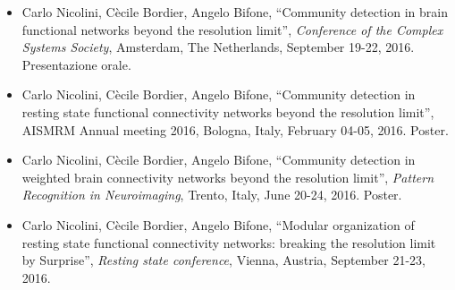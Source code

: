 \begin{itemize}
	\item Carlo Nicolini, Cècile Bordier, Angelo Bifone, ``Community detection in  brain functional networks beyond the resolution limit'', \emph{Conference of the Complex Systems Society},  Amsterdam, The Netherlands, September 19-22, 2016. Presentazione orale.
	\item Carlo Nicolini, Cècile Bordier, Angelo Bifone, ``Community detection in resting state functional connectivity networks beyond the resolution limit'', AISMRM Annual meeting 2016, Bologna, Italy, February 04-05, 2016. Poster.
	\item Carlo Nicolini, Cècile Bordier, Angelo Bifone, ``Community detection in weighted brain connectivity networks beyond the resolution limit'', \emph{Pattern Recognition in Neuroimaging}, Trento, Italy, June 20-24, 2016. Poster.
	\item Carlo Nicolini, Cècile Bordier, Angelo Bifone, ``Modular organization of resting state functional connectivity networks: breaking the resolution limit by Surprise'', \emph{Resting state conference}, Vienna, Austria, September 21-23, 2016. 
\end{itemize}

